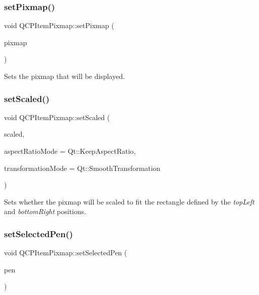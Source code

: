 \subsubsection{\texorpdfstring{set\+Pixmap()}{setPixmap()}}
{\footnotesize\ttfamily void Q\+C\+P\+Item\+Pixmap\+::set\+Pixmap (\begin{DoxyParamCaption}\item[{const Q\+Pixmap \&}]{pixmap }\end{DoxyParamCaption})}

Sets the pixmap that will be displayed. \mbox{\label{classQCPItemPixmap_ab4d44529a1c6c8d37d0ea7560e042777}} 
\subsubsection{\texorpdfstring{set\+Scaled()}{setScaled()}}
{\footnotesize\ttfamily void Q\+C\+P\+Item\+Pixmap\+::set\+Scaled (\begin{DoxyParamCaption}\item[{bool}]{scaled,  }\item[{Qt\+::\+Aspect\+Ratio\+Mode}]{aspect\+Ratio\+Mode = {\ttfamily Qt\+:\+:KeepAspectRatio},  }\item[{Qt\+::\+Transformation\+Mode}]{transformation\+Mode = {\ttfamily Qt\+:\+:SmoothTransformation} }\end{DoxyParamCaption})}

Sets whether the pixmap will be scaled to fit the rectangle defined by the {\itshape top\+Left} and {\itshape bottom\+Right} positions. \mbox{\label{classQCPItemPixmap_afc5e479e88e53740176ce77cb70dd67a}} 
\subsubsection{\texorpdfstring{set\+Selected\+Pen()}{setSelectedPen()}}
{\footnotesize\ttfamily void Q\+C\+P\+Item\+Pixmap\+::set\+Selected\+Pen (\begin{DoxyParamCaption}\item[{const Q\+Pen \&}]{pen }\end{DoxyParamCaption})}

